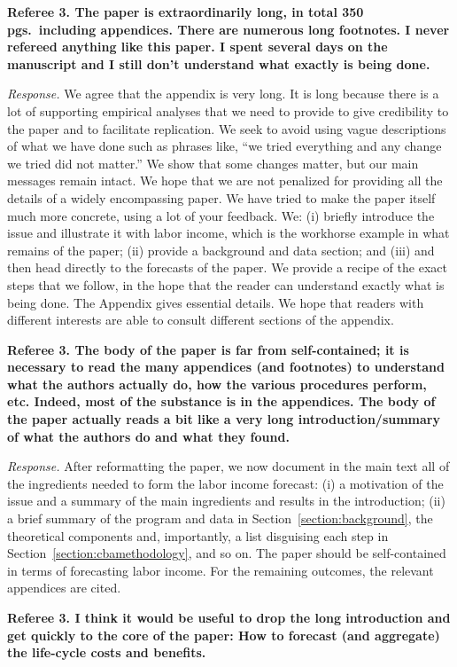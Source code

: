 \noindent \textbf{Referee 3. The paper is extraordinarily long, in total 350 pgs.\ including appendices. There are numerous long footnotes. I never refereed anything like this paper. I spent several days on the manuscript and I still don't understand what exactly is being done.}

\noindent \textit{Response.} We agree that the appendix is very long. It is long because there is a lot of supporting empirical analyses that we need to provide to give credibility to the paper and to facilitate replication. We seek to avoid using vague descriptions of what we have done such as phrases like, ``we tried everything and any change we tried did not matter.'' We show that some changes matter, but our main messages remain intact. We hope that we are not penalized for providing all the details of a widely encompassing paper. We have tried to make the paper itself much more concrete, using a lot of your feedback. We: (i) briefly introduce the issue and illustrate it with labor income, which is the workhorse example in what remains of the paper; (ii) provide a background and data section; and (iii) and then head directly to the forecasts of the paper. We provide a recipe of the exact steps that we follow, in the hope that the reader can understand exactly what is being done. The Appendix gives essential details. We hope that readers with different interests are able to consult different sections of the appendix.

\noindent \textbf{Referee 3. The body of the paper is far from self-contained; it is necessary to read the many appendices (and footnotes) to understand what the authors actually do, how the various procedures perform, etc. Indeed, most of the substance is in the appendices. The body of the paper actually reads a bit like a very long introduction/summary of what the authors do and what they found.}

\noindent \textit{Response.} After reformatting the paper, we now document in the main text all of the ingredients needed to form the labor income forecast: (i) a motivation of the issue and a summary of the main ingredients and results in the introduction; (ii) a brief summary of the program and data in Section~\ref{section:background}, the theoretical components and, importantly, a list disguising each step in Section~\ref{section:cbamethodology}, and so on. The paper should be self-contained in terms of forecasting labor income. For the remaining  outcomes, the relevant appendices are cited.

\noindent \textbf{Referee 3.  I think it would be useful to drop the long introduction and get quickly to the core of the paper: How to forecast (and aggregate) the life-cycle costs and benefits.}

